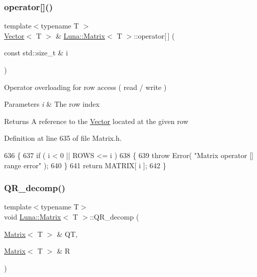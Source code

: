\subsubsection{\texorpdfstring{operator[]()}{operator[]()}\hspace{0.1cm}{\footnotesize\ttfamily [2/2]}}
{\footnotesize\ttfamily template$<$typename T $>$ \\
\hyperlink{classLuna_1_1Vector}{Vector}$<$ T $>$ \& \hyperlink{classLuna_1_1Matrix}{Luna\+::\+Matrix}$<$ T $>$\+::operator\mbox{[}$\,$\mbox{]} (\begin{DoxyParamCaption}\item[{const std\+::size\+\_\+t \&}]{i }\end{DoxyParamCaption})\hspace{0.3cm}{\ttfamily [inline]}}



Operator overloading for row access ( read / write ) 


\begin{DoxyParams}{Parameters}
{\em i} & The row index \\
\hline
\end{DoxyParams}
\begin{DoxyReturn}{Returns}
A reference to the \hyperlink{classLuna_1_1Vector}{Vector} located at the given row 
\end{DoxyReturn}


Definition at line 635 of file Matrix.\+h.


\begin{DoxyCode}
636   \{
637     \textcolor{keywordflow}{if} ( i < 0 || ROWS <= i )
638     \{
639       \textcolor{keywordflow}{throw} Error( \textcolor{stringliteral}{"Matrix operator [] range error"} );
640     \}
641     \textcolor{keywordflow}{return} MATRIX[ i ];
642   \}
\end{DoxyCode}
\mbox{\label{classLuna_1_1Matrix_aad8367cf9e292301e40c24c4011a2e8f}} 
\subsubsection{\texorpdfstring{Q\+R\+\_\+decomp()}{QR\_decomp()}}
{\footnotesize\ttfamily template$<$typename T$>$ \\
void \hyperlink{classLuna_1_1Matrix}{Luna\+::\+Matrix}$<$ T $>$\+::Q\+R\+\_\+decomp (\begin{DoxyParamCaption}\item[{\hyperlink{classLuna_1_1Matrix}{Matrix}$<$ T $>$ \&}]{QT,  }\item[{\hyperlink{classLuna_1_1Matrix}{Matrix}$<$ T $>$ \&}]{R }\end{DoxyParamCaption})\hspace{0.3cm}{\ttfamily [inline]}}



